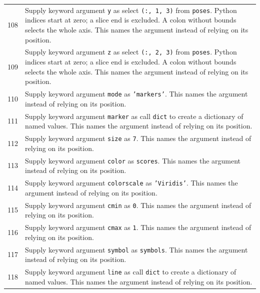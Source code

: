 \documentclass[11pt,a4paper]{book}
\begin{document}
\begin{longtable}{r p{}}
108 & Supply keyword argument \texttt{y} as select \texttt{(:, 1, 3)} from \texttt{poses}. Python indices start at zero; a slice end is excluded. A colon without bounds selects the whole axis. This names the argument instead of relying on its position. \\

109 & Supply keyword argument \texttt{z} as select \texttt{(:, 2, 3)} from \texttt{poses}. Python indices start at zero; a slice end is excluded. A colon without bounds selects the whole axis. This names the argument instead of relying on its position. \\

110 & Supply keyword argument \texttt{mode} as \texttt{'markers'}. This names the argument instead of relying on its position. \\

111 & Supply keyword argument \texttt{marker} as call \texttt{dict} to create a dictionary of named values. This names the argument instead of relying on its position. \\

112 & Supply keyword argument \texttt{size} as \texttt{7}. This names the argument instead of relying on its position. \\

113 & Supply keyword argument \texttt{color} as \texttt{scores}. This names the argument instead of relying on its position. \\

114 & Supply keyword argument \texttt{colorscale} as \texttt{'Viridis'}. This names the argument instead of relying on its position. \\

115 & Supply keyword argument \texttt{cmin} as \texttt{0}. This names the argument instead of relying on its position. \\

116 & Supply keyword argument \texttt{cmax} as \texttt{1}. This names the argument instead of relying on its position. \\

117 & Supply keyword argument \texttt{symbol} as \texttt{symbols}. This names the argument instead of relying on its position. \\

118 & Supply keyword argument \texttt{line} as call \texttt{dict} to create a dictionary of named values. This names the argument instead of relying on its position. \\


\end{longtable}
\end{document}
